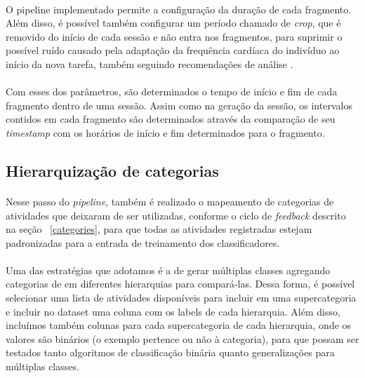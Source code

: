             \paragraph{} O pipeline implementado permite a configuração da duração de cada fragmento. Além disso, é possível também configurar um período chamado de \textit{crop}, que é removido do início de cada sessão e não entra nos fragmentos, para suprimir o possível ruído causado pela adaptação da frequência cardíaca do indivíduo ao início da nova tarefa, também seguindo recomendações de análise \cite{Quintana2016GuidelinesCommunication}. 
            
            \paragraph{} Com esses dos parâmetros, são determinados o tempo de início e fim de cada fragmento dentro de uma sessão. Assim como na geração da sessão, os intervalos contidos em cada fragmento são determinados através da comparação de seu \textit{timestamp} com os horários de início e fim determinados para o fragmento.
            
        \subsection{Hierarquização de categorias}
        
            \paragraph{} Nesse passo do \textit{pipeline}, também é realizado o mapeamento de categorias de atividades que deixaram de ser utilizadas, conforme o ciclo de \textit{feedback} descrito na seção ~\ref{categories}, para que todas as atividades registradas estejam padronizadas para a entrada de treinamento dos classificadores. 
            
            \paragraph{} Uma das estratégias que adotamos é a de gerar múltiplas classes agregando categorias de em diferentes hierarquias para compará-las. Dessa forma, é possível selecionar uma lista de atividades disponíveis para incluir em uma supercategoria e incluir no dataset uma coluna com os labels de cada hierarquia. Além disso, incluímos também colunas para cada supercategoria de cada hierarquia, onde os valores são binários (o exemplo pertence ou não à categoria), para que possam ser testados tanto algoritmos de classificação binária quanto generalizações para múltiplas classes.
            
